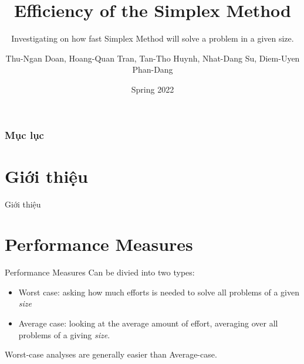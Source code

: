 \documentclass[10pt]{beamer}
\begin{document}
\author{Thu-Ngan Doan, Hoang-Quan Tran, Tan-Tho Huynh, Nhat-Dang Su, Diem-Uyen Phan-Dang}
\title{Efficiency of the Simplex Method}
\subtitle{Investigating on how fast Simplex Method will solve a problem in a given size.}
\date{Spring 2022}
\subject{CSC10104 - Linear Programming}


\begin{frame}[plain]
\maketitle
\end{frame}

\begin{frame}
\frametitle{Mục lục}
\tableofcontents
\end{frame}

\section{Giới thiệu}
\begin{frame}{Giới thiệu}

\end{frame}

\section{Performance Measures}
\begin{frame}{Performance Measures}
Can be divied into two types:
\begin{itemize}
\item Worst case: asking how much efforts is needed to solve all problems of a given \textit{size}
\item Average case: looking at the average amount of effort, averaging over all problems of a giving \textit{size}. 
\end{itemize}
Worst-case analyses are generally easier than Average-case.
\end{frame}
\end{document}
